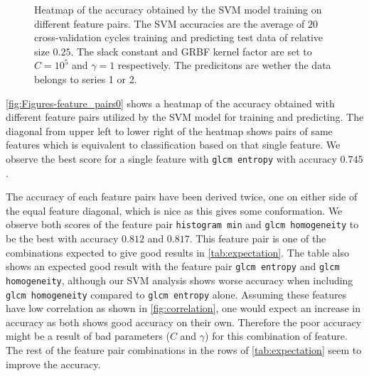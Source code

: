 \begin{figure}[H]
\centering
{}
\caption{Heatmap of the accuracy obtained by the SVM model training on different feature pairs. The SVM accuracies are the average 
of $20$ cross-validation cycles training and predicting test data of relative size $0.25$.
The slack constant and GRBF kernel factor are set to $C=10^5$ and $\gamma=1 $ respectively.
 The predicitons are wether the data belongs to series 1 or 2.}
\label{fig:Figures-feature_pairs0}
\end{figure}

\autoref{fig:Figures-feature_pairs0} shows a heatmap of the accuracy obtained with different 
feature pairs utilized by the SVM model for training and predicting. The diagonal from upper left 
to lower right of the heatmap shows pairs of same features which is equivalent to classification 
based on that single feature. We observe the best score for a single feature with \verb|glcm entropy|
with accuracy $0.745$.

The accuracy of each feature pairs have been derived twice, one on either side of the equal feature diagonal, which is nice as 
this gives some conformation. We observe both scores of the feature pair \verb|histogram min| and \verb|glcm homogeneity| 
to be the best with accuracy $0.812$ and $0.817$. This feature pair is one of the combinations 
expected to give good results in \autoref{tab:expectation}. The table also shows an expected 
good result with the feature pair \verb|glcm entropy| and \verb|glcm homogeneity|, although 
our SVM analysis shows worse accuracy when including \verb|glcm homogeneity| compared to \verb|glcm entropy| 
alone. Assuming these features have low correlation as shown in \autoref{fig:correlation}, one would expect 
an increase in accuracy as both shows good accuracy on their own. Therefore the poor accuracy 
might be a result of bad parameters ($C$ and $\gamma $) for this combination of feature. The rest of the 
feature pair combinations in the rows of \autoref{tab:expectation} seem to improve the accuracy. 

